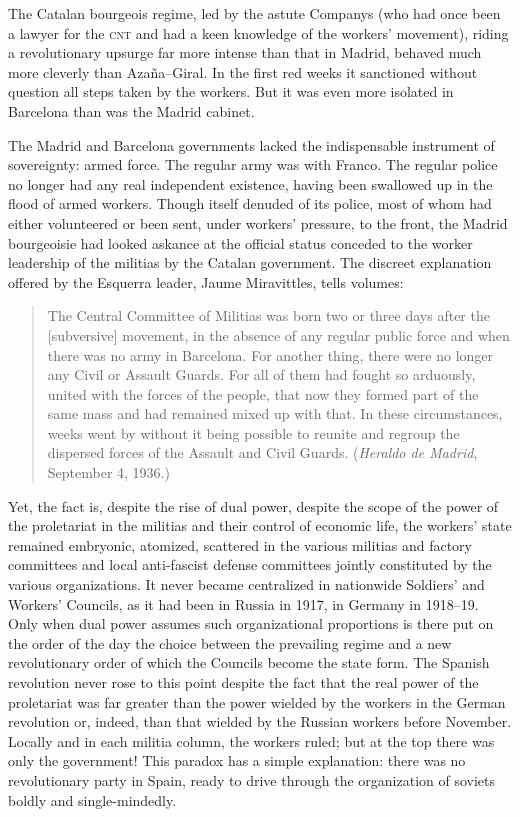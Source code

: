 The Catalan bourgeois regime, led by the astute Companys{\indexLCompanys} (who had once been a lawyer for the \textsc{cnt} and had a keen knowledge of the workers’ movement), riding a revolutionary upsurge far more intense than that in Madrid, behaved much more cleverly than Azaña--Giral. In the first red weeks it sanctioned without question all steps taken by the workers. But it was even more isolated in Barcelona than was the Madrid cabinet.

The Madrid and Barcelona governments lacked the indispensable instrument of sovereignty: armed force. The regular army was with Franco. The regular police no longer had any real independent existence, having been swallowed up in the flood of armed workers. Though itself denuded of its police, most of whom had either volunteered or been sent, under workers’ pressure, to the front, the Madrid bourgeoisie had looked askance at the official status conceded to the worker leadership of the militias by the Catalan government. The discreet explanation offered by the Esquerra leader,{\indexEsquerra} Jaume Miravittles, tells volumes:

\begin{quotation}
  The Central Committee of Militias was born two or three days after the [subversive] movement, in the absence of any regular public force and when there was no army in Barcelona. For another thing, there were no longer any Civil or Assault Guards. For all of them had fought so arduously, united with the forces of the people, that now they formed part of the same mass and had remained mixed up with that. In these circumstances, weeks went by without it being possible to reunite and regroup the dispersed forces of the Assault and Civil Guards. (\emph{Heraldo de Madrid}, September 4, 1936.)
\end{quotation}

Yet, the fact is, despite the rise of dual power, despite the scope of the power of the proletariat in the militias and their control of economic life, the workers’ state remained embryonic, atomized, scattered in the various militias and factory committees and local anti-fascist defense committees jointly constituted by the various organizations. It never became centralized in nationwide Soldiers’ and Workers’ Councils, as it had been in Russia in 1917, in Germany in 1918–19. Only when dual power assumes such organizational proportions is there put on the order of the day the choice between the prevailing regime and a new revolutionary order of which the Councils become the state form. The Spanish revolution never rose to this point despite the fact that the real power of the proletariat was far greater than the power wielded by the workers in the German revolution or, indeed, than that wielded by the Russian workers before November. Locally and in each militia column, the workers ruled; but at the top there was only the government! This paradox has a simple explanation: there was no revolutionary party in Spain, ready to drive through the organization of soviets boldly and single-mindedly.

